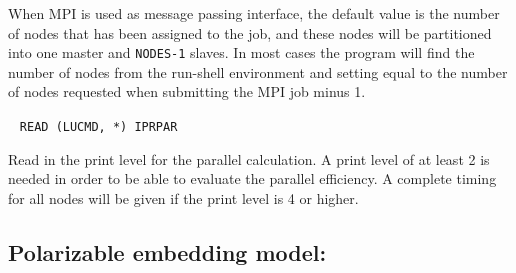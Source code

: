 \begin{description}
When MPI is used as message passing interface, the
default value is the number of nodes that has been assigned to the
job, and these nodes will be partitioned into one master and
\verb|NODES-1| slaves. In most cases the program will
find the number of nodes from the run-shell environment and setting
equal to the number of nodes requested when submitting the MPI job minus 1.

%
%
\item[\Key{PRINT}]\verb| |\newline
\verb|READ (LUCMD, *) IPRPAR|

Read in the print level for the parallel calculation. A print level of
at least 2 is needed in order to be able to evaluate the
parallel efficiency. A complete
timing for all nodes will be
given if the print level is 4 or higher.
\end{description}

\subsection{Polarizable embedding model: }
\label{subsec:peqm} 

